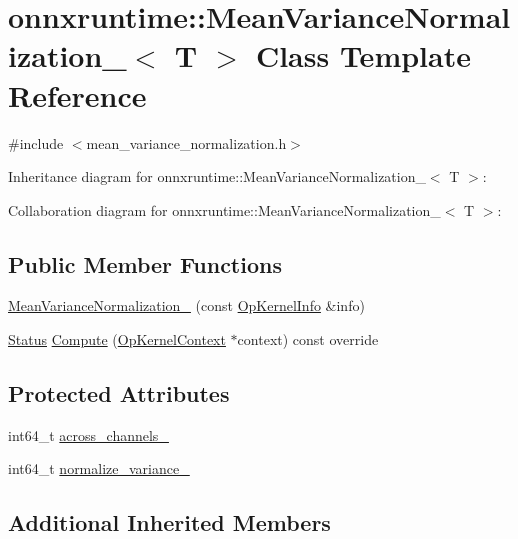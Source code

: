 \hypertarget{classonnxruntime_1_1MeanVarianceNormalization__0}{}\section{onnxruntime\+:\+:Mean\+Variance\+Normalization\+\_$<$ T $>$ Class Template Reference}
\label{classonnxruntime_1_1MeanVarianceNormalization__0}


{\ttfamily \#include $<$mean\+\_\+variance\+\_\+normalization.\+h$>$}



Inheritance diagram for onnxruntime\+:\+:Mean\+Variance\+Normalization\+\_$<$ T $>$\+:


Collaboration diagram for onnxruntime\+:\+:Mean\+Variance\+Normalization\+\_$<$ T $>$\+:
\subsection*{Public Member Functions}
\begin{DoxyCompactItemize}
\item 
\mbox{\hyperlink{classonnxruntime_1_1MeanVarianceNormalization__0_afdfe03dfefc949743cdb8e4f821b26b9}{Mean\+Variance\+Normalization\+\_}} (const \mbox{\hyperlink{classonnxruntime_1_1OpKernelInfo}{Op\+Kernel\+Info}} \&info)
\item 
\mbox{\hyperlink{classonnxruntime_1_1common_1_1Status}{Status}} \mbox{\hyperlink{classonnxruntime_1_1MeanVarianceNormalization__0_a8a48b8e2a5b93f7c73b0b2f6df7e25ef}{Compute}} (\mbox{\hyperlink{classonnxruntime_1_1OpKernelContext}{Op\+Kernel\+Context}} $\ast$context) const override
\end{DoxyCompactItemize}
\subsection*{Protected Attributes}
\begin{DoxyCompactItemize}
\item 
int64\+\_\+t \mbox{\hyperlink{classonnxruntime_1_1MeanVarianceNormalization__0_a1a88cf5276e9398eb94fda2129dcc381}{across\+\_\+channels\+\_\+}}
\item 
int64\+\_\+t \mbox{\hyperlink{classonnxruntime_1_1MeanVarianceNormalization__0_a32898f49c342b8ffd0ed6c55c922500a}{normalize\+\_\+variance\+\_\+}}
\end{DoxyCompactItemize}
\subsection*{Additional Inherited Members}



